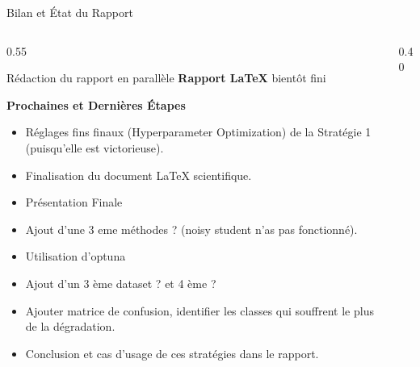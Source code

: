 \documentclass[aspectratio=169, 10pt]{beamer}
\begin{document}
\begin{frame}{Bilan et État du Rapport}

  \begin{columns}[T]
    \begin{column}{0.55\textwidth}
      \begin{block}{\footnotesize Rédaction du rapport en parallèle}
        \footnotesize \textbf{Rapport LaTeX} bientôt fini 
      \end{block}

      \vspace{0.3cm}
      \textbf{\color{primary}Prochaines et Dernières Étapes}
      \begin{itemize}\footnotesize\setlength\itemsep{2pt}
        \item Réglages fins finaux (Hyperparameter Optimization) de la Stratégie 1 (puisqu'elle est victorieuse).
        \item Finalisation du document LaTeX scientifique.
        \item Présentation Finale 
        \item Ajout d'une 3 eme méthodes ? (noisy student n'as pas fonctionné).
        \item Utilisation d'optuna 
        \item Ajout d'un 3 ème dataset ? et 4 ème ? 
        \item Ajouter matrice de confusion, identifier les classes qui souffrent le plus de la dégradation. 
        \item Conclusion et cas d'usage de ces stratégies dans le rapport. 
      \end{itemize}
    \end{column}
    
    \begin{column}{0.40\textwidth}
      \vspace{-0.2cm}
      \centering
      

\end{column}
\end{columns}
\end{frame}
\end{document}
